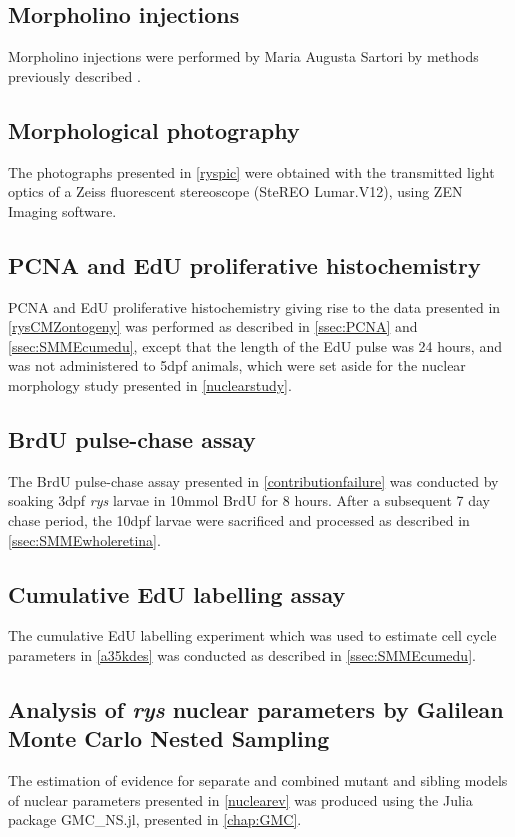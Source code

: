 \subsection{Morpholino injections}
\label{ssec:moinjxn}
Morpholino injections were performed by Maria Augusta Sartori by methods previously described \cite{Wong2015a}.
 
\subsection{Morphological photography}
The photographs presented in \autoref{ryspic} were obtained with the transmitted light optics of a Zeiss fluorescent stereoscope (SteREO Lumar.V12), using ZEN Imaging software.

\subsection{PCNA and EdU proliferative histochemistry}
\label{ssec:rysPCNAEdU}
PCNA and EdU proliferative histochemistry giving rise to the data presented in \autoref{rysCMZontogeny} was performed as described in \autoref{ssec:PCNA} and \autoref{ssec:SMMEcumedu}, except that the length of the EdU pulse was 24 hours, and was not administered to 5dpf animals, which were set aside for the nuclear morphology study presented in \autoref{nuclearstudy}.

\subsection{BrdU pulse-chase assay}
\label{ssec:rysBrdUpulse}
The BrdU pulse-chase assay presented in \autoref{contributionfailure} was conducted by soaking 3dpf \textit{rys} larvae in 10\si{\milli\mole} BrdU for 8 hours. After a subsequent 7 day chase period, the 10dpf larvae were sacrificed and processed as described in \autoref{ssec:SMMEwholeretina}.

\subsection{Cumulative EdU labelling assay}
\label{ssec:RyscumEdU}
The cumulative EdU labelling experiment which was used to estimate cell cycle parameters in \autoref{a35kdes} was conducted as described in \autoref{ssec:SMMEcumedu}.

\subsection{Analysis of \textit{rys} nuclear parameters by Galilean Monte Carlo Nested Sampling}
\label{ssec:rysnucev}
The estimation of evidence for separate and combined mutant and sibling models of nuclear parameters presented in \autoref{nuclearev} was produced using the Julia package GMC\_NS.jl, presented in \autoref{chap:GMC}. 

